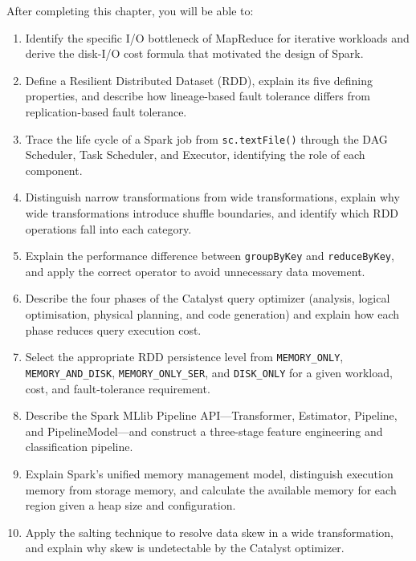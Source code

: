 \begin{chapterlearning}
After completing this chapter, you will be able to:
\begin{enumerate}
  \item Identify the specific I/O bottleneck of MapReduce for iterative
        workloads and derive the disk-I/O cost formula that motivated
        the design of Spark.
  \item Define a Resilient Distributed Dataset (RDD), explain its five
        defining properties, and describe how lineage-based fault tolerance
        differs from replication-based fault tolerance.
  \item Trace the life cycle of a Spark job from \texttt{sc.textFile()}
        through the DAG Scheduler, Task Scheduler, and Executor, identifying
        the role of each component.
  \item Distinguish narrow transformations from wide transformations,
        explain why wide transformations introduce shuffle boundaries,
        and identify which RDD operations fall into each category.
  \item Explain the performance difference between \texttt{groupByKey}
        and \texttt{reduceByKey}, and apply the correct operator to avoid
        unnecessary data movement.
  \item Describe the four phases of the Catalyst query optimizer (analysis,
        logical optimisation, physical planning, and code generation) and
        explain how each phase reduces query execution cost.
  \item Select the appropriate RDD persistence level from
        \texttt{MEMORY\_ONLY}, \texttt{MEMORY\_AND\_DISK},
        \texttt{MEMORY\_ONLY\_SER}, and \texttt{DISK\_ONLY} for a given
        workload, cost, and fault-tolerance requirement.
  \item Describe the Spark MLlib Pipeline API---Transformer, Estimator,
        Pipeline, and PipelineModel---and construct a three-stage
        feature engineering and classification pipeline.
  \item Explain Spark's unified memory management model, distinguish
        execution memory from storage memory, and calculate the available
        memory for each region given a heap size and configuration.
  \item Apply the salting technique to resolve data skew in a wide
        transformation, and explain why skew is undetectable by the
        Catalyst optimizer.
\end{enumerate}
\end{chapterlearning}

